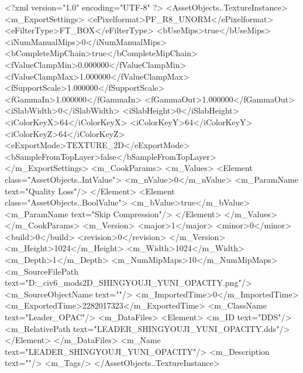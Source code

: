 <?xml version="1.0" encoding="UTF-8" ?>
<AssetObjects..TextureInstance>
	<m_ExportSettings>
		<ePixelformat>PF_R8_UNORM</ePixelformat>
		<eFilterType>FT_BOX</eFilterType>
		<bUseMips>true</bUseMips>
		<iNumManualMips>0</iNumManualMips>
		<bCompleteMipChain>true</bCompleteMipChain>
		<fValueClampMin>0.000000</fValueClampMin>
		<fValueClampMax>1.000000</fValueClampMax>
		<fSupportScale>1.000000</fSupportScale>
		<fGammaIn>1.000000</fGammaIn>
		<fGammaOut>1.000000</fGammaOut>
		<iSlabWidth>0</iSlabWidth>
		<iSlabHeight>0</iSlabHeight>
		<iColorKeyX>64</iColorKeyX>
		<iColorKeyY>64</iColorKeyY>
		<iColorKeyZ>64</iColorKeyZ>
		<eExportMode>TEXTURE_2D</eExportMode>
		<bSampleFromTopLayer>false</bSampleFromTopLayer>
	</m_ExportSettings>
	<m_CookParams>
		<m_Values>
			<Element class="AssetObjects..IntValue">
				<m_nValue>0</m_nValue>
				<m_ParamName text="Quality Loss"/>
			</Element>
			<Element class="AssetObjects..BoolValue">
				<m_bValue>true</m_bValue>
				<m_ParamName text="Skip Compression"/>
			</Element>
		</m_Values>
	</m_CookParams>
	<m_Version>
		<major>1</major>
		<minor>0</minor>
		<build>0</build>
		<revision>0</revision>
	</m_Version>
	<m_Height>1024</m_Height>
	<m_Width>1024</m_Width>
	<m_Depth>1</m_Depth>
	<m_NumMipMaps>10</m_NumMipMaps>
	<m_SourceFilePath text="D:\Documents\GitHub\Uzuki_civ6_mods\LandsolYuni\Texture2D\LEADER_SHINGYOUJI_YUNI_OPACITY.png"/>
	<m_SourceObjectName text=""/>
	<m_ImportedTime>0</m_ImportedTime>
	<m_ExportedTime>2282017323</m_ExportedTime>
	<m_ClassName text="Leader_OPAC"/>
	<m_DataFiles>
		<Element>
			<m_ID text="DDS"/>
			<m_RelativePath text="LEADER_SHINGYOUJI_YUNI_OPACITY.dds"/>
		</Element>
	</m_DataFiles>
	<m_Name text="LEADER_SHINGYOUJI_YUNI_OPACITY"/>
	<m_Description text=""/>
	<m_Tags/>
</AssetObjects..TextureInstance>

